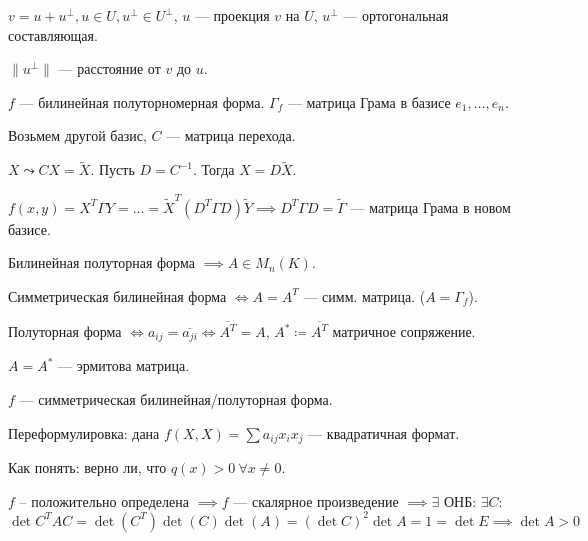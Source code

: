  \begin{definition}
     $v = u+u^{\perp}, u \in U, u^{\perp} \in U^{\perp}$,  $u$ --- проекция  $v$ на  $U$, $u^\perp$ --- ортогональная составляющая.

     $\|u^{\perp}\|$ --- расстояние от $v$ до  $u$.
 \end{definition}
 \begin{statement}
     $f$ --- билинейная полуторномерная форма.  $\Gamma_f$ --- матрица Грама в базисе  $e_1, \ldots, e_n$.

     Возьмем другой базис, $C$ --- матрица перехода.

     $X \leadsto C X = \widetilde{X}$. Пусть  $D = C^{-1}$. Тогда  $X = D\widetilde{X}$.

     $f(x, y) = X^T\Gamma Y = \ldots = \widetilde{X}^{T} (D^T\Gamma D)\widetilde{Y} \implies D^T\Gamma D = \widetilde{\Gamma}$ --- матрица Грама в новом базисе.
 \end{statement}

 Билинейная полуторная форма $\implies A \in M_n(K)$.

 Симметрическая билинейная форма  $\iff A = A^T$ --- симм. матрица. ($A = \Gamma_f$).

 Полуторная форма $\iff a_{ij} = \overline{a_{ji}} \iff \overline{A^T} = A$,  $A^* \coloneqq \overline{A^T}$ матричное сопряжение.

  $A = A^*$ --- эрмитова матрица.

 $f$ --- симметрическая билинейная/полуторная форма.

 Переформулировка: дана  $f(X, X) = \sum a_{ij} x_i x_j$ --- квадратичная формат.

 Как понять: верно ли, что  $q(x) > 0 \ \forall x \neq 0$.

  $f$ -- положительно определена  $\implies f$ --- скалярное произведение  $\implies \exists $ ОНБ:  $\exists C\!:$  $\det C^TAC = \det(C^T)\det(C)\det(A) = (\det C)^2 \det A = 1 = \det E \implies \det A > 0$


